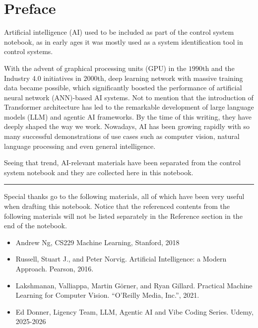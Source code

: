 \chapter*{Preface}

Artificial intelligence (AI) used to be included as part of the control system notebook, as in early ages it was mostly used as a system identification tool in control systems.

With the advent of graphical processing units (GPU) in the $1990$th and the Industry 4.0 initiatives in $2000$th, deep learning network with massive training data became possible, which significantly boosted the performance of artificial neural network (ANN)-based AI systems. Not to mention that the introduction of Transformer architecture has led to the remarkable development of large language models (LLM) and agentic AI frameworks. By the time of this writing, they have deeply shaped the way we work. Nowadays, AI has been growing rapidly with so many successful demonstrations of use cases such as computer vision, natural language processing and even general intelligence.

Seeing that trend, AI-relevant materials have been separated from the control system notebook and they are collected here in this notebook.

\vspace{0.1in}
\noindent \rule{1in}{0.4pt}
\vspace{0.1in}

Special thanks go to the following materials, all of which have been very useful when drafting this notebook. Notice that the referenced contents from the following materials will not be listed separately in the Reference section in the end of the notebook.
\begin{itemize}
  \item Andrew Ng, CS229 Machine Learning, Stanford, 2018
  \item Russell, Stuart J., and Peter Norvig. Artificial Intelligence: a Modern Approach. Pearson, 2016.
  \item Lakshmanan, Valliappa, Martin G\"orner, and Ryan Gillard. Practical Machine Learning for Computer Vision. ``O'Reilly Media, Inc.'', 2021. 
  \item Ed Donner, Ligency Team, LLM, Agentic AI and Vibe Coding Series. Udemy, 2025-2026
\end{itemize} 